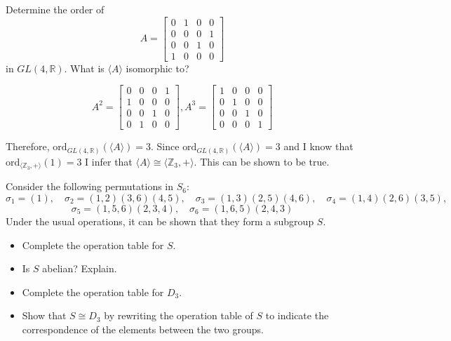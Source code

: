 \documentclass[titlepage]{article}
\newenvironment{problem}[2][Problem]{\begin{tcolorbox}\begin{trivlist}
\item[\hskip \labelsep {\bfseries #1}\hskip \labelsep {\bfseries #2.}]}{\end{trivlist}\end{tcolorbox}}
\begin{document}
 
\fancyhf{}
\cfoot{\thepage}

\begin{problem}{1}
Determine the order of 
$$ A = \begin{bmatrix} 0&1&0&0\\0&0&0&1\\0&0&1&0\\1&0&0&0\end{bmatrix}$$
in $GL(4,\mathbb{R})$. What is $\langle A \rangle$ isomorphic to?
\end{problem}
$$A^2 = \begin{bmatrix}0&0&0&1 \\ 1&0&0&0 \\ 0&0&1&0 \\ 0&1&0&0 \end{bmatrix}, A^3 = \begin{bmatrix}1&0&0&0 \\ 0&1&0&0 \\ 0&0&1&0 \\0 &0&0&1 \end{bmatrix}$$

Therefore, $\text{ord}_{GL(4,\mathbb{R})}(\langle A \rangle) = 3$. Since $\text{ord}_{GL(4,\mathbb{R})}(\langle A \rangle) = 3$ and I know that $\text{ord}_{\langle\mathbb{Z}_3,+\rangle}(1) = 3$ I infer that $\langle A \rangle \cong \langle \mathbb{Z}_3, + \rangle$. This can be shown to be true.
\begin{problem}{2}
Consider the following permutations in $S_6$:
$$\sigma_1 = (1), \quad \sigma_2 = (1,2)(3,6)(4,5), \quad \sigma_3 = (1,3)(2,5)(4,6), \quad \sigma_4 = (1,4)(2,6)(3,5), $$ $$\sigma_5 = (1,5,6)(2,3,4), \quad \sigma_6 = (1,6,5)(2,4,3)$$
Under the usual operations, it can be shown that they form a subgroup $S$.
\begin{itemize}
\item[(a)] Complete the operation table for $S$.
\item[(b)] Is $S$ abelian? Explain.
\item[(c)] Complete the operation table for $D_3$.
\item[(d)] Show that $S\cong D_3$ by rewriting the operation table of $S$ to indicate the correspondence of the elements between the two groups.
\end{itemize}
\end{problem}
\end{document}
